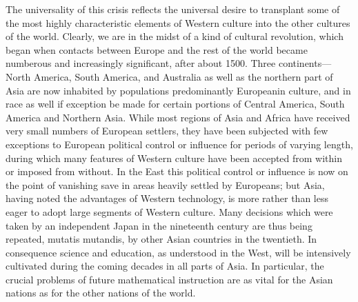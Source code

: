 The universality of this crisis reflects the universal desire to transplant some of the most highly characteristic elements of Western culture into the other cultures of the world. Clearly, we are in the midst of a kind of cultural revolution, which began when contacts between Europe and the rest of the world became numberous and increasingly significant, after about 1500. Three continents---North America, South America, and Australia as well as the northern part of Asia are now inhabited by populations predominantly European\pageoriginale in culture, and in race as well if exception be made for certain portions of Central America, South America and Northern Asia. While most regions of Asia and Africa have received very small numbers of European settlers, they have been subjected with few exceptions to European political control or influence for periods of varying length, during which many features of Western culture have been accepted from within or imposed from without. In the East this political control or influence is now on the point of vanishing save in areas heavily settled by Europeans; but Asia, having noted the advantages of Western technology, is more rather than less eager to adopt large segments of Western culture. Many decisions which were taken by an independent Japan in the nineteenth century are thus being repeated, mutatis mutandis, by other Asian countries in the twentieth. In consequence science and education, as understood in the West, will be intensively cultivated during the coming decades in all parts of Asia. In particular, the crucial problems of future mathematical instruction are as vital for the Asian nations as for the other nations of the world.  

